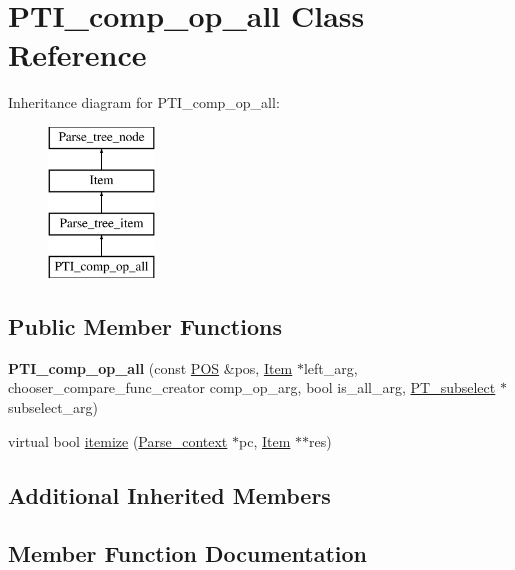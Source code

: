 \hypertarget{classPTI__comp__op__all}{}\section{P\+T\+I\+\_\+comp\+\_\+op\+\_\+all Class Reference}
\label{classPTI__comp__op__all}
Inheritance diagram for P\+T\+I\+\_\+comp\+\_\+op\+\_\+all\+:\begin{figure}[H]
\begin{center}
\leavevmode
\includegraphics[height=4.000000cm]{classPTI__comp__op__all}
\end{center}
\end{figure}
\subsection*{Public Member Functions}
\begin{DoxyCompactItemize}
\item 
\mbox{\label{classPTI__comp__op__all_a5e4df5f35a2ae194f48111049ec6a7f5}} 
{\bfseries P\+T\+I\+\_\+comp\+\_\+op\+\_\+all} (const \mbox{\hyperlink{structYYLTYPE}{P\+OS}} \&pos, \mbox{\hyperlink{classItem}{Item}} $\ast$left\+\_\+arg, chooser\+\_\+compare\+\_\+func\+\_\+creator comp\+\_\+op\+\_\+arg, bool is\+\_\+all\+\_\+arg, \mbox{\hyperlink{classPT__subselect}{P\+T\+\_\+subselect}} $\ast$subselect\+\_\+arg)
\item 
virtual bool \mbox{\hyperlink{classPTI__comp__op__all_a790ee351d642e9f8e7329b598b69eba0}{itemize}} (\mbox{\hyperlink{structParse__context}{Parse\+\_\+context}} $\ast$pc, \mbox{\hyperlink{classItem}{Item}} $\ast$$\ast$res)
\end{DoxyCompactItemize}
\subsection*{Additional Inherited Members}


\subsection{Member Function Documentation}
\mbox{\label{classPTI__comp__op__all_a790ee351d642e9f8e7329b598b69eba0}} 
